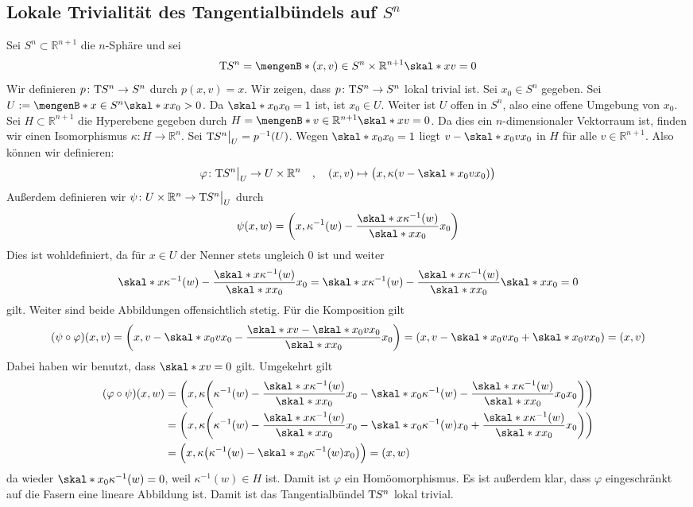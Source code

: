 \subsection{Lokale Trivialität des Tangentialbündels auf $S^n$} %
\label{sub:lokal_trivial_Sn}
Sei $S^n \subset \mathds{R}^{n+1}$ die $n$-Sphäre und sei 
\[
	\Tmap S^n = \set[(x,v) \in S^n \times \mathds{R}^{n+1}]{\skal*{x}{v}=0} 
\]
Wir definieren $p \colon \mathrm{T}\mkern-0.85mu S^n \to S^n$ durch $p(x,v)=x$. Wir zeigen, dass $p \colon \mathrm{T}\mkern-0.85mu S^n \to S^n$ lokal trivial ist.
Sei $x_0 \in S^n$ gegeben. Sei $U := \set[x \in S^n]{\skal*{x}{x_0}>0}$. Da $\skal*{x_0}{x_0}=1$ ist, ist $x_0 \in U$. Weiter ist $U$ offen in $S^n$, also eine offene 
Umgebung von $x_0$. Sei $H \subset \mathds{R}^{n+1}$ die Hyperebene gegeben durch $H = \set[v \in \mathds{R}^{n+1}]{\skal*{x}{v}=0}$. Da dies ein $n$-dimensionaler 
Vektorraum ist, finden wir einen Isomorphismus $\kappa \colon H \to \mathds{R}^n$. Sei $\mathrm{T}\mkern-0.85mu S^n \big|_U=p^{-1}(U)$. Wegen $\skal*{x_0}{x_0}=1$ liegt $v- \skal*{x_0}{v} x_0$
in $H$ für alle $v \in \mathds{R}^{n+1}$. Also können wir definieren:
\[
	\varphi \colon \Tmap S^n\big|_{U} \to U \times \mathds{R}^n \quad , \quad (x,v) \mapsto \enbrace[\big]{x, \kappa(v - \skal*{x_0}{v} x_0)} 
\]
Außerdem definieren wir $\psi \colon U \times \mathbb{R}^n \to \mathrm{T}\mkern-0.85mu S^n \big|_U$ durch
\[
	\psi(x,w) = \enbrace*{x , \kappa^{-1}(w) - \frac{\skal*{x}{\kappa^{-1}(w)}}{\skal*{x}{x_0}} x_0 } 
\]
Dies ist wohldefiniert, da für $x \in U$ der Nenner stets ungleich $0$ ist und weiter
\[
	\skal*{x}{\kappa^{-1}(w) - \frac{\skal*{x}{\kappa ^{-1}(w)}}{\skal*{x}{x_0}} x_0} = \skal*{x}{\kappa^{-1}(w)} - \frac{\skal*{x}{\kappa ^{-1}(w)}}{\skal*{x}{x_0}} 
	\skal*{x}{x_0} = 0
\]
gilt. Weiter sind beide Abbildungen offensichtlich stetig. Für die Komposition gilt
\begin{align*}
	(\psi \circ \varphi)(x,v) = \enbrace*{x, v - \skal*{x_0}{v} x_0 - \frac{\skal*{x}{v- \skal*{x_0}{v} x_0}}{\skal*{x}{x_0}}x_0 }
	= \enbrace*{x, v - \skal*{x_0}{v} x_0 + \skal*{x_0}{v}x_0} = (x,v)  
\end{align*}
Dabei haben wir benutzt, dass $\skal*{x}{v}=0$ gilt. Umgekehrt gilt
\begin{align*}
	(\varphi \circ \psi)(x,w) &= \enbrace*{x , \kappa \enbrace*{\kappa^{-1}(w) - \frac{\skal*{x}{\kappa^{-1}(w)}}{\skal*{x}{x_0}}x_0 - \skal*{x_0}{\kappa^{-1}(w) - 
	\frac{\skal*{x}{\kappa^{-1}(w)}}{\skal*{x}{x_0}}x_0} x_0 } } \\
	&= \enbrace*{x , \kappa \enbrace*{\kappa^{-1}(w) - \frac{\skal*{x}{\kappa^{-1}(w)}}{\skal*{x}{x_0}}x_0 - 
	\skal*{x_0}{\kappa^{-1}(w)} x_0 + \frac{\skal*{x}{\kappa^{-1}(w)}}{\skal*{x}{x_0}} x_0 }}\\
	&= \enbrace[\Big]{x , \kappa \enbrace*{\kappa^{-1}(w) - \skal*{x_0}{\kappa^{-1}(w)} x_0} } = (x,w)
\end{align*}
da wieder $\skal*{x_0}{\kappa ^{-1}(w)}=0$, weil $\kappa ^{-1}(w) \in H$ ist. Damit ist $\varphi$ ein Homöomorphismus. Es ist außerdem klar, dass $\varphi$ eingeschränkt auf 
die Fasern eine lineare Abbildung ist. Damit ist das Tangentialbündel $\mathrm{T}\mkern-0.85mu S^n$ lokal trivial. \bewende








\cleardoubleoddemptypage
{}
\setcounter{page}{1}

\printindex
\listoffigures
\todototoc
{}

